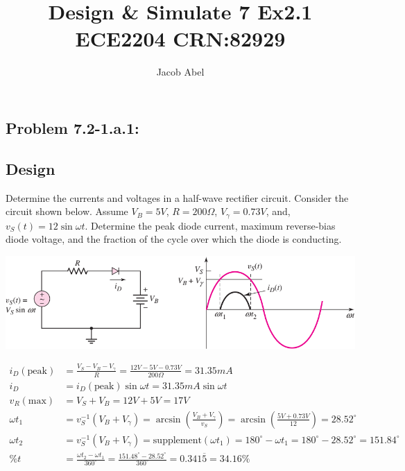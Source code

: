 \documentclass[12pt,letterpaper,titlepage]{article}
\author{Jacob Abel}
\title{	Design \& Simulate 7 Ex2.1
	\\\large ECE2204 CRN:82929
}
\begin{document}
\maketitle
\begin{raggedright}

\section{Problem 7.2-1.a.1: }
\subsection{Design}
Determine the currents and voltages in a half-wave rectifier circuit. 
 Consider the circuit shown below. 
 Assume $V_B = 5 V$, $R = 200 \Omega$, 
  $V_\gamma = 0.73 V$,
  and, $v_S(t) = 12  \sin \omega t$.
 Determine the peak diode current, 
  maximum reverse-bias diode voltage, and 
  the fraction of the cycle over which the diode is conducting.

\begin{center}
\includegraphics[width=\textwidth, height=9\baselineskip, keepaspectratio=true]{ds1}
\end{center}
\begin{align}
    i_D(\text{peak}) 
      &= \frac{V_S - V_B - V_\gamma}{R} 
       = \frac{12V - 5V - 0.73V}{200\Omega} = 31.35mA
\\  i_D 
      &= i_D(\text{peak}) \sin \omega t 
       = 31.35mA \sin \omega t
\\  v_R(\text{max}) 
      &= V_S + V_B
       = 12V + 5V
       = 17V
\\  \omega t_1 
	  &= v_S^{-1}(V_B + V_\gamma) 
	   = \arcsin(\frac{V_B + V_\gamma}{v_S}) 
	   = \arcsin(\frac{5V + 0.73V}{12}) 
	   = 28.52^\circ 
\\	\omega t_2
	  &= v_S^{-1}(V_B + V_\gamma) 
	   = \text{supplement}(\omega t_1)
	   = 180^\circ - \omega t_1
	   = 180^\circ - 28.52^\circ
	   = 151.84^\circ
\\  \% t
	  &= \frac{\omega t_2 - \omega t_1}{360^\circ} 
	   = \frac{151.48^\circ - 28.52^\circ}{360^\circ}
	   = 0.341\overline{5}
	   = 34.16\%
\end{align}


\end{raggedright}
\end{document}

